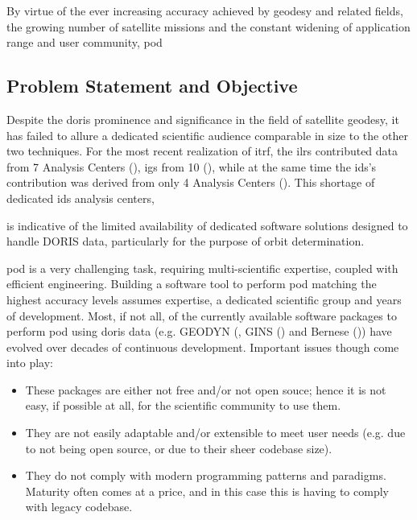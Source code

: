 By virtue of the ever increasing accuracy achieved by geodesy and related fields, 
the growing number of satellite missions and the constant widening of application 
range and user community, \gls{pod} 
\fi

\subsection{Problem Statement and Objective}\label{ssec:statement-and-objective}

Despite the \gls{doris} prominence and significance in the field of satellite geodesy,
it has failed to allure a dedicated scientific audience comparable in size to 
the other two techniques. For the most recent realization of \gls{itrf}, the 
\gls{ilrs} contributed data from 7 Analysis Centers (\cite{Pavlis2023}), \gls{igs} 
from 10 (\cite{Rebischung2021}), while at the same time the \gls{ids}'s contribution 
was derived from only 4 Analysis Centers (\cite{Moreaux2022}). This shortage of 
dedicated \gls{ids} analysis centers,
\iffalse
also reflects the scarcity in dedicated
software tools to process \gls{doris} data, first and foremost for orbit 
determination. \fi
is indicative of the limited availability of dedicated software solutions designed to handle DORIS data, particularly for the purpose of orbit determination.

\gls{pod} is a very challenging task, requiring multi-scientific expertise,
coupled with efficient engineering. Building a software tool to perform \gls{pod} 
matching the highest accuracy levels assumes expertise, a dedicated scientific 
group and years of development. Most, if not all, of the currently available 
software packages to perform \gls{pod} using \gls{doris} data (e.g. GEODYN (\cite{Geodyn2015}, 
GINS (\cite{Gins2013}) and Bernese (\cite{Stepanek2010})) have evolved over
decades of continuous development. Important issues though come into play:
\begin{itemize}
  \item These packages are either not free and/or not open souce; hence it is not 
    easy, if possible at all, for the scientific community to use them.
  \item They are not easily adaptable and/or extensible to meet user needs (e.g. due 
    to not being open source, or due to their sheer codebase size).
  \item They do not comply with modern programming patterns and paradigms. Maturity 
    often comes at a price, and in this case this is having to comply with legacy 
    codebase.
\end{itemize}

